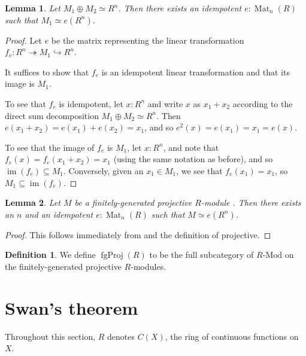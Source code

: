 \documentclass[11pt]{article}
\newcommand{\Mat}{\operatorname{Mat}}
\newcommand{\fgProj}{\operatorname{fgProj}}
\newcommand{\im}{\operatorname{im}}
\theoremstyle{plain}
\newtheorem{lemma}{Lemma}[section]
\theoremstyle{definition}
\newtheorem{definition}{Definition}[section]
\begin{document}
\begin{lemma} \label{lemma:fg-projective-idempotent-aux}
  Let \(M_1 \oplus M_2 \simeq R^n\). Then there exists an idempotent \(e : \Mat_n(R)\) such that \(M_1 \simeq e(R^n)\).
\end{lemma}

\begin{proof}
  Let \(e\) be the matrix representing the linear transformation \(f_e : R^n \twoheadrightarrow M_1 \hookrightarrow R^n\).

  It suffices to show that \(f_e\) is an idempotent linear transformation and that its image is \(M_1\).

  To see that \(f_e\) is idempotent, let \(x : R^n\) and write \(x\) as \(x_1 + x_2\) according to the direct sum decomposition \(M_1 \oplus M_2 \simeq R^n\). Then \(e(x_1 + x_2) = e(x_1) + e(x_2) = x_1\), and so \(e^2(x) = e(x_1) = x_1 = e(x)\).

  To see that the image of \(f_e\) is \(M_1\), let \(x : R^n\), and note that \(f_e(x) = f_e(x_1 + x_2) = x_1\) (using the same notation as before), and so \(\im(f_e) \subseteq M_1\). Conversely, given an \(x_1 \in M_1\), we see that \(f_e(x_1) = x_1\), so \(M_1 \subseteq \im(f_e)\).
\end{proof}

\begin{lemma} \label{lemma:fg-projective-idempotent}
  Let \(M\) be a finitely-generated projective \(R\)-module . Then there exists an \(n\) and an idempotent \(e : \Mat_n(R)\) such that \(M \simeq e(R^n)\).
\end{lemma}

\begin{proof}
  This follows immediately from  and the definition  of projective.
\end{proof}

\begin{definition} \label{def:category-projective-modules}
  We define \(\fgProj(R)\) to be the full subcategory of \(R\text{-Mod}\) on the finitely-generated projective \(R\)-modules.
\end{definition}

\section{Swan's theorem}

Throughout this section, \(R\) denotes \(C(X)\), the ring of continuous functions on \(X\).
\end{document}
